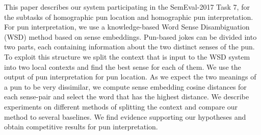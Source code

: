 This paper describes our system participating in the SemEval-2017 Task 7, for the subtasks of homographic pun location and homographic pun interpretation. For pun interpretation, we use a knowledge-based Word Sense Disambiguation (WSD) method based on sense embeddings. Pun-based jokes can be divided into two parts, each containing information about the two distinct senses of the pun. To exploit this structure we split the context that is input to the WSD system into two local contexts and find the best sense for each of them. We use the output of pun interpretation for pun location. As we expect the two meanings of a pun to be very dissimilar, we compute sense embedding cosine distances for each sense-pair and select the word that has the highest distance. We describe experiments on different methods of splitting the context and compare our method to several baselines. We find evidence supporting our hypotheses and obtain competitive results for pun interpretation.
